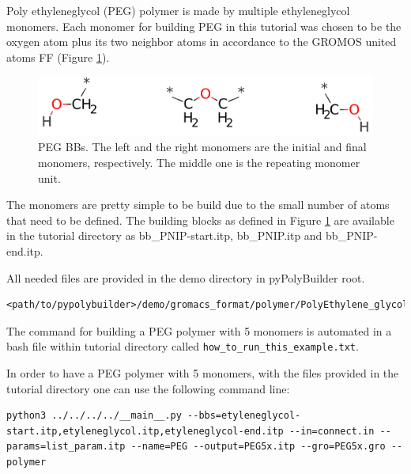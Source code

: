 
Poly ethyleneglycol (PEG) polymer is made by multiple ethyleneglycol monomers.
Each monomer for building PEG in this tutorial was chosen to be the oxygen atom plus its two neighbor atoms in accordance to the GROMOS united atoms FF (Figure \ref{fig:PEGBBs}).

\begin{figure}
    \centering
    \includegraphics[width=\textwidth]{PEG/PEGBBs.png}
    \caption{PEG BBs. The left and the right monomers are the initial and final monomers, respectively.
            The middle one is the repeating monomer unit.}
    \label{fig:PEGBBs}
\end{figure}

The monomers are pretty simple to be build due to the small number of atoms that need to be defined.
The building blocks as defined in Figure \ref{fig:PEGBBs} are available in the tutorial directory as bb\_PNIP-start.itp, bb\_PNIP.itp and bb\_PNIP-end.itp.

All needed files are provided in the demo directory in pyPolyBuilder root.
\begin{lstlisting}
<path/to/pypolybuilder>/demo/gromacs_format/polymer/PolyEthylene_glycol
\end{lstlisting}

The command for building a PEG polymer with 5 monomers is automated in a bash file within tutorial directory called \texttt{how\_to\_run\_this\_example.txt}.

In order to have a PEG polymer with 5 monomers, with the files provided in the tutorial directory one can use the following command line:

\begin{lstlisting}
python3 ../../../../__main__.py --bbs=etyleneglycol-start.itp,etyleneglycol.itp,etyleneglycol-end.itp --in=connect.in --params=list_param.itp --name=PEG --output=PEG5x.itp --gro=PEG5x.gro --polymer
\end{lstlisting}


